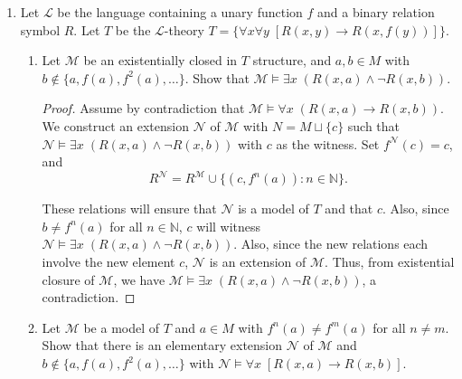 \documentclass{article}
\begin{document}
\begin{enumerate}[label={\bf Q\arabic*:}]
  \item Let $\mathcal{L}$ be the language containing a unary function $f$
    and a binary relation symbol $R$. Let $T$ be the $\mathcal{L}$-theory
    $T=\{\forall x\forall y\; [R(x,y)\rightarrow R(x,f(y))]\}$.

    \begin{enumerate}
      \item Let $\mathcal{M}$ be an existentially closed in $T$ structure,
        and $a,b\in M$ with $b\not\in\{a,f(a),f^2(a),\ldots\}$. Show that
        $\mathcal{M}\models \exists x\; (R(x,a)\wedge\neg R(x,b))$.

        \begin{proof}
          Assume by contradiction that $\mathcal{M}\models \forall x\;
          (R(x,a)\rightarrow R(x,b))$. We construct an extension
          $\mathcal{N}$ of $\mathcal{M}$ with $N=M\sqcup\{c\}$
          such that $\mathcal{N}\models \exists x\; (R(x,a)\wedge\neg
          R(x,b))$ with $c$ as the witness. Set $f^\mathcal{N}(c)=c$, and
          \[R^\mathcal{N}= R^\mathcal{M} \cup
          \{(c,f^n(a)):n\in\mathbb{N}\}.\]

          These relations will ensure that $\mathcal{N}$ is a model of $T$
          and that $c$. Also, since $b\neq f^n(a)$ for all
          $n\in\mathbb{N}$, $c$ will witness $\mathcal{N}\models \exists x\;
          (R(x,a)\wedge\neg R(x,b))$. Also, since the new relations each
          involve the new element $c$, $\mathcal{N}$ is an extension of
          $\mathcal{M}$. Thus, from existential closure of $\mathcal{M}$,
          we have $\mathcal{M}\models \exists x\; (R(x,a)\wedge\neg
          R(x,b))$, a contradiction.
        \end{proof}

      \item Let $\mathcal{M}$ be a model of $T$ and $a\in M$ with
        $f^n(a)\neq f^m(a)$ for all $n\neq m$. Show that there is an
        elementary extension $\mathcal{N}$ of $\mathcal{M}$ and
        $b\not\in\{a,f(a),f^2(a),\ldots\}$ with $\mathcal{N}\models\forall
        x\; [R(x,a)\rightarrow R(x,b)]$.


\end{enumerate}
\end{enumerate}
\end{document}
